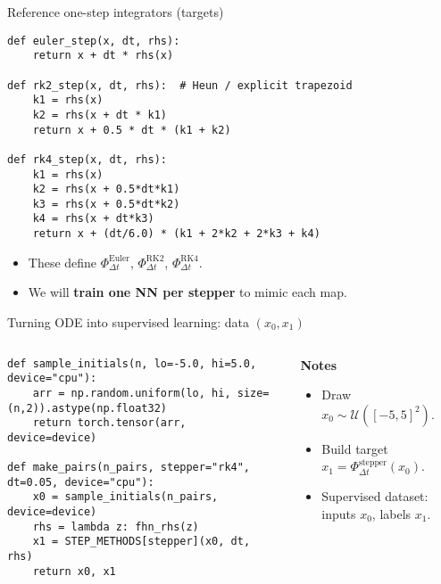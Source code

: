 \documentclass[aspectratio=169]{beamer}
\begin{document}
\begin{frame}[fragile]{Reference one-step integrators (targets)}
\begin{lstlisting}[style=py,caption={Euler / Heun(RK2) / RK4 steppers},label={lst:steppers}]
def euler_step(x, dt, rhs):
    return x + dt * rhs(x)

def rk2_step(x, dt, rhs):  # Heun / explicit trapezoid
    k1 = rhs(x)
    k2 = rhs(x + dt * k1)
    return x + 0.5 * dt * (k1 + k2)

def rk4_step(x, dt, rhs):
    k1 = rhs(x)
    k2 = rhs(x + 0.5*dt*k1)
    k3 = rhs(x + 0.5*dt*k2)
    k4 = rhs(x + dt*k3)
    return x + (dt/6.0) * (k1 + 2*k2 + 2*k3 + k4)
\end{lstlisting}
\vspace{-1ex}
\begin{itemize}
  \item These define $\Phi_{\Delta t}^{\text{Euler}}$, $\Phi_{\Delta t}^{\text{RK2}}$, $\Phi_{\Delta t}^{\text{RK4}}$.
  \item We will \textbf{train one NN per stepper} to mimic each map.
\end{itemize}
\end{frame}

\begin{frame}[fragile]{Turning ODE into supervised learning: data $(x_0,x_1)$}
\begin{columns}[T,totalwidth=\textwidth]
\begin{column}{0.58\textwidth}
\begin{lstlisting}[style=py,caption={Sampling and pairing},label={lst:datagen}]
def sample_initials(n, lo=-5.0, hi=5.0, device="cpu"):
    arr = np.random.uniform(lo, hi, size=(n,2)).astype(np.float32)
    return torch.tensor(arr, device=device)

def make_pairs(n_pairs, stepper="rk4", dt=0.05, device="cpu"):
    x0 = sample_initials(n_pairs, device=device)
    rhs = lambda z: fhn_rhs(z)
    x1 = STEP_METHODS[stepper](x0, dt, rhs)
    return x0, x1
\end{lstlisting}
\end{column}
\begin{column}{0.42\textwidth}
\textbf{Notes}
\begin{itemize}
  \item Draw $x_0\sim\mathcal U([-5,5]^2)$.
  \item Build target $x_1=\Phi_{\Delta t}^{\text{stepper}}(x_0)$.
  \item Supervised dataset: inputs $x_0$, labels $x_1$.
\end{itemize}
\end{column}
\end{columns}
\end{frame}
\end{document}
